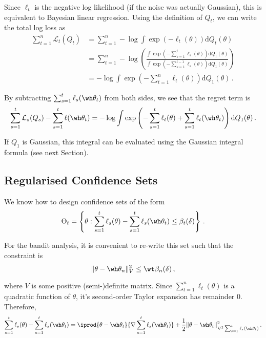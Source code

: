 Since $\ell_t$ is the negative log likelihood (if the noise was actually Gaussian), this is equivalent to Bayesian linear regression. Using the definition of $Q_t$, we can write the total log loss as
\begin{align*}
\sum_{t=1}^{n}\mathcal{L}_t(Q_t) &= \sum_{t=1}^{n}-\log\int\exp(-\ell_t(\theta))\mathrm{d}Q_t(\theta)\\
&= \sum_{t=1}^{n}-\log\left(\frac{\int \exp(-\sum_{s=1}^{t}\ell_s(\theta))\mathrm{d}Q_1(\theta)}{\int \exp(-\sum_{s=1}^{t-1}\ell_s(\theta))\mathrm{d}Q_1(\theta)}\right)\\
&= -\log\int \exp\left(-\sum_{t=1}^{n}\ell_t(\theta)\right)\mathrm{d}Q_1(\theta)\,.
\end{align*}

By subtracting $\sum_{s=1}^{t}\ell_s(\wh\theta_t)$ from both sides, we see that the regret term is
\begin{equation}
\sum_{s=1}^{t}\mathcal{L}_s(Q_s) - \sum_{s=1}^{t}\ell(\wh\theta_t) = -\log\int \exp\left(-\sum_{s=1}^{t}\ell_t(\theta) + \sum_{s=1}^{t}\ell_t(\wh\theta_t)\right)\mathrm{d}Q_1(\theta)\,.\label{eqn:ewa_regret}
\end{equation}

If $Q_1$ is Gaussian, this integral can be evaluated using the Gaussian integral formula (see next Section).


\subsection{Regularised Confidence Sets}
\label{sec:regularised_sets}

We know how to design confidence sets of the form
\begin{equation*}
\Theta_t = \left\{\theta: \sum_{s=1}^{t}\ell_s(\theta) - \sum_{s=1}^{t}\ell_s(\wh \theta_t) \leq \beta_t(\delta)\right\}\,.
\end{equation*}

For the bandit analysis, it is convenient to re-write this set such that the constraint is
\begin{equation*}
\|\theta - \wh \theta_n\|_{V}^2 \leq \wt\beta_n(\delta)\,,
\end{equation*}

where $V$ is some positive (semi-)definite matrix. Since $\sum_{t=1}^{n}\ell_t(\theta)$ is a quadratic function of $\theta$, it's second-order Taylor expansion has remainder 0. Therefore,
\begin{equation*}
\sum_{s=1}^{t}\ell_s(\theta) - \sum_{s=1}^{t}\ell_s(\wh\theta_t) = \iprod{\theta - \wh\theta_t}{\nabla\sum_{s=1}^{t}\ell_s(\wh\theta_t)} + \frac{1}{2}\|\theta - \wh\theta_t\|_{\nabla^2\sum_{s=1}^{t}\ell_s(\wh\theta_t)}^2\,.
\end{equation*}

